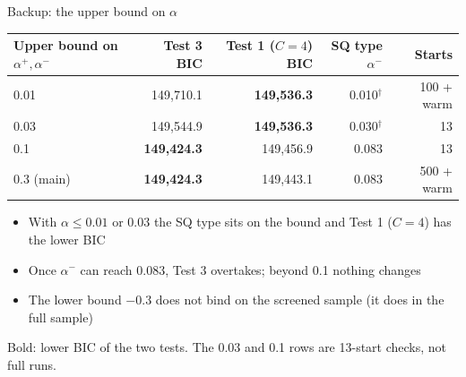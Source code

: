 \documentclass[aspectratio=169,11pt]{beamer}
\newcommand{\ap}{\alpha^{+}}
\newcommand{\am}{\alpha^{-}}
\newcommand{\bd}{\ensuremath{^{\dagger}}}
\newcommand{\tabnote}[1]{\par\vfill{\scriptsize\color{muted}#1\par}}
\newcommand{\tight}{\setlength{\itemsep}{3pt}}
\begin{document}
\begin{frame}{Backup: the upper bound on $\alpha$}
{\centering\footnotesize
\begin{tabular}{l rr r r}
\toprule
Upper bound on $\ap,\am$ & Test 3 BIC & Test 1 ($C=4$) BIC & SQ type $\am$ & Starts\\
\midrule
0.01 & 149{,}710.1 & \textbf{149{,}536.3} & 0.010\bd & 100 + warm\\
0.03 & 149{,}544.9 & \textbf{149{,}536.3} & 0.030\bd & 13\\
0.1 & \textbf{149{,}424.3} & 149{,}456.9 & 0.083 & 13\\
0.3 (main) & \textbf{149{,}424.3} & 149{,}443.1 & 0.083 & 500 + warm\\
\bottomrule
\end{tabular}\par}
\begin{itemize}\small\tight
  \item With $\alpha\le 0.01$ or $0.03$ the SQ type sits on the bound and Test 1 ($C=4$) has the lower BIC
  \item Once $\am$ can reach 0.083, Test 3 overtakes; beyond 0.1 nothing changes
  \item The lower bound $-0.3$ does not bind on the screened sample (it does in the full sample)
\end{itemize}
\tabnote{Bold: lower BIC of the two tests. The 0.03 and 0.1 rows are 13-start checks, not full runs.}
\end{frame}
\end{document}
